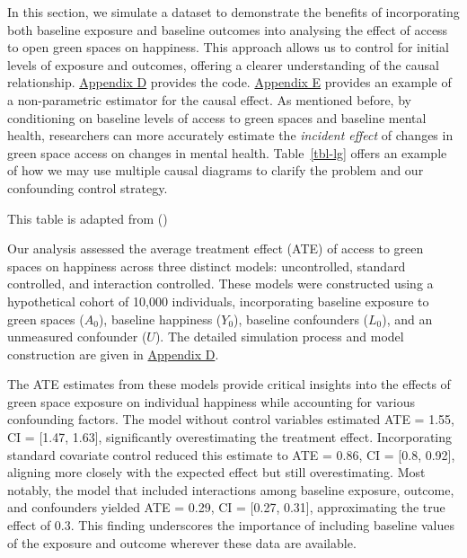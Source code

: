 \documentclass[
  singlecolumn]{article}
\begin{document}
In this section, we simulate a dataset to demonstrate the benefits of
incorporating both baseline exposure and baseline outcomes into
analysing the effect of access to open green spaces on happiness. This
approach allows us to control for initial levels of exposure and
outcomes, offering a clearer understanding of the causal relationship.
\hyperref[appendix-d-simulation-of-different-confounding-control-strategies]{Appendix
D} provides the code.
\hyperref[appendix-e-non-parametric-estimation-of-average-treatment-effects-using-causal-forests]{Appendix
E} provides an example of a non-parametric estimator for the causal
effect. As mentioned before, by conditioning on baseline levels of
access to green spaces and baseline mental health, researchers can more
accurately estimate the \emph{incident effect} of changes in green space
access on changes in mental health. Table~\ref{tbl-lg} offers an example
of how we may use multiple causal diagrams to clarify the problem and
our confounding control strategy.

\begin{table}

\caption{\label{tbl-lg}This table is adapted from
()}

\centering{

\examplelongitudinal

}

\end{table}%

Our analysis assessed the average treatment effect (ATE) of access to
green spaces on happiness across three distinct models: uncontrolled,
standard controlled, and interaction controlled. These models were
constructed using a hypothetical cohort of 10,000 individuals,
incorporating baseline exposure to green spaces (\(A_0\)), baseline
happiness (\(Y_0\)), baseline confounders (\(L_0\)), and an unmeasured
confounder (\(U\)). The detailed simulation process and model
construction are given in
\hyperref[appendix-simulate-longitudinal-ate]{Appendix D}.

The ATE estimates from these models provide critical insights into the
effects of green space exposure on individual happiness while accounting
for various confounding factors. The model without control variables
estimated ATE = 1.55, CI = {[}1.47, 1.63{]}, significantly
overestimating the treatment effect. Incorporating standard covariate
control reduced this estimate to ATE = 0.86, CI = {[}0.8, 0.92{]},
aligning more closely with the expected effect but still overestimating.
Most notably, the model that included interactions among baseline
exposure, outcome, and confounders yielded ATE = 0.29, CI = {[}0.27,
0.31{]}, approximating the true effect of 0.3. This finding underscores
the importance of including baseline values of the exposure and outcome
wherever these data are available.
\end{document}
